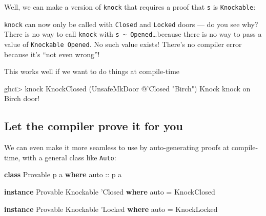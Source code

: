 \documentclass[]{article}
\newenvironment{Shaded}{}{}
\newcommand{\DataTypeTok}[1]{\textcolor[rgb]{0.56,0.13,0.00}{#1}}
\newcommand{\FunctionTok}[1]{\textcolor[rgb]{0.02,0.16,0.49}{#1}}
\newcommand{\KeywordTok}[1]{\textcolor[rgb]{0.00,0.44,0.13}{\textbf{#1}}}
\newcommand{\NormalTok}[1]{#1}
\newcommand{\OtherTok}[1]{\textcolor[rgb]{0.00,0.44,0.13}{#1}}
\newcommand{\StringTok}[1]{\textcolor[rgb]{0.25,0.44,0.63}{#1}}
\begin{document}
Well, we can make a version of \texttt{knock} that requires a proof that
\texttt{s} is \texttt{Knockable}:

\begin{Shaded}
\end{Shaded}

\texttt{knock} can now only be called with \texttt{Closed} and \texttt{Locked}
doors --- do you see why? There is no way to call \texttt{knock} with
\texttt{s\ \textasciitilde{}\ \textquotesingle{}Opened}\ldots{}because there is
no way to pass a value of \texttt{Knockable\ \textquotesingle{}Opened}. No such
value exists! There's no compiler error because it's ``not even wrong''!

This works well if we want to do things at compile-time

\begin{Shaded}
\begin{Highlighting}[]
\NormalTok{ghci}\FunctionTok{>}\NormalTok{ knock }\DataTypeTok{KnockClosed}\NormalTok{ (}\DataTypeTok{UnsafeMkDoor} \FunctionTok{@}\NormalTok{'}\DataTypeTok{Closed} \StringTok{"Birch"}\NormalTok{)}
\DataTypeTok{Knock}\NormalTok{ knock on }\DataTypeTok{Birch}\NormalTok{ door}\FunctionTok{!}
\end{Highlighting}
\end{Shaded}

\hypertarget{let-the-compiler-prove-it-for-you}{%
\subsection{Let the compiler prove it for
you}\label{let-the-compiler-prove-it-for-you}}

We can even make it more seamless to use by auto-generating proofs at
compile-time, with a general class like \texttt{Auto}:

\begin{Shaded}
\begin{Highlighting}[]
\KeywordTok{class} \DataTypeTok{Provable}\NormalTok{ p a }\KeywordTok{where}
\OtherTok{    auto ::}\NormalTok{ p a}

\KeywordTok{instance} \DataTypeTok{Provable} \DataTypeTok{Knockable}\NormalTok{ '}\DataTypeTok{Closed} \KeywordTok{where}
\NormalTok{    auto }\FunctionTok{=} \DataTypeTok{KnockClosed}

\KeywordTok{instance} \DataTypeTok{Provable} \DataTypeTok{Knockable}\NormalTok{ '}\DataTypeTok{Locked} \KeywordTok{where}
\NormalTok{    auto }\FunctionTok{=} \DataTypeTok{KnockLocked}
\end{Highlighting}
\end{Shaded}
\end{document}
